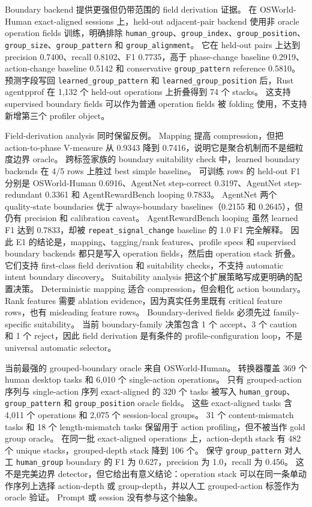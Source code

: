 \documentclass[10pt,twocolumn]{ctexart}
\newcommand{\toolname}{agentpprof}
\begin{document}
Boundary backend 提供更强但仍带范围的 field derivation 证据。
在 OSWorld-Human exact-aligned sessions 上，held-out adjacent-pair backend 使用非 oracle operation fields 训练，明确排除 \texttt{human\_group}、\texttt{group\_index}、\texttt{group\_position}、\texttt{group\_size}、\texttt{group\_pattern} 和 \texttt{group\_alignment}。
它在 held-out pairs 上达到 precision 0.7400、recall 0.8102、F1 0.7735，高于 phase-change baseline 0.2919、action-change baseline 0.5142 和 conservative \texttt{group\_pattern} reference 0.5810。
预测字段写回 \texttt{learned\_group\_pattern} 和 \texttt{learned\_group\_position} 后，Rust \toolname{} 在 1,132 个 held-out operations 上折叠得到 74 个 stacks。
这支持 supervised boundary fields 可以作为普通 operation fields 被 folding 使用，不支持新增第三个 profiler object。

Field-derivation analysis 同时保留反例。
Mapping 提高 compression，但把 action-to-phase V-measure 从 0.9343 降到 0.7416，说明它是聚合机制而不是细粒度边界 oracle。
跨标签家族的 boundary suitability check 中，learned boundary backends 在 4/5 rows 上胜过 best simple baseline。
可训练 rows 的 held-out F1 分别是 OSWorld-Human 0.6916、AgentNet step-correct 0.3197、AgentNet step-redundant 0.3361 和 AgentRewardBench looping 0.7833。
AgentNet 两个 quality-state boundaries 优于 always-boundary baselines（0.2155 和 0.2645），但仍有 precision 和 calibration caveat。
AgentRewardBench looping 虽然 learned F1 达到 0.7833，却被 \texttt{repeat\_signal\_change} baseline 的 1.0 F1 完全解释。
因此 E1 的结论是，mapping、tagging/rank features、profile specs 和 supervised boundary backends 都只是写入 operation fields，然后由 operation stack 折叠。
它们支持 first-class field derivation 和 suitability checks，不支持 automatic intent boundary discovery。
Suitability analysis 把这个扩展策略写成更明确的配置决策。
Deterministic mapping 适合 compression，但会粗化 action boundary。
Rank features 需要 ablation evidence，因为真实任务里既有 critical feature rows，也有 misleading feature rows。
Boundary-derived fields 必须先过 family-specific suitability。
当前 boundary-family 决策包含 1 个 accept、3 个 caution 和 1 个 reject，因此 field derivation 是有条件的 profile-configuration loop，不是 universal automatic selector。

当前最强的 grouped-boundary oracle 来自 OSWorld-Human。
转换器覆盖 369 个 human desktop tasks 和 6,010 个 single-action operations。
只有 grouped-action 序列与 single-action 序列 exact-aligned 的 320 个 tasks 被写入 \texttt{human\_group}、\texttt{group\_pattern} 和 \texttt{group\_position} oracle fields。
这些 exact-aligned tasks 含 4,011 个 operations 和 2,075 个 session-local groups。
31 个 content-mismatch tasks 和 18 个 length-mismatch tasks 保留用于 action profiling，但不被当作 gold group oracle。
在同一批 exact-aligned operations 上，action-depth stack 有 482 个 unique stacks，grouped-depth stack 降到 106 个。
保守 \texttt{group\_pattern} 对人工 \texttt{human\_group} boundary 的 F1 为 0.627，precision 为 1.0，recall 为 0.456。
这不是完美边界 detector，但它给出有意义结论：operation stack 可以在同一条单动作序列上选择 action-depth 或 group-depth，并以人工 grouped-action 标签作为 oracle 验证。
Prompt 或 session 没有参与这个抽象。
\end{document}
